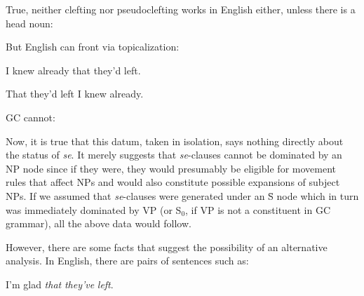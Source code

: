 \z

\z

\z

\z

\z

\z

\noindent True, neither clefting nor pseudoclefting works in English either, unless there is a head noun:

\z

\z
But English can front via topicalization:

\ea\label{ex:2:177}
I knew already that they'd left.
\z

\ea\label{ex:2:178}
That they'd left I knew already.
\z

\noindent GC cannot:

\z

\z

Now, it is true that this datum, taken in isolation, says nothing directly about the status of \textit{se}. It merely suggests that \textit{se}-clauses cannot be dominated by an NP node since if they were, they would presumably be eligible for movement rules that affect NPs and would also constitute possible expansions of subject NPs. If we assumed that \textit{se}-clauses were generated under an \=S node which in turn was immediately dominated by VP (or S$_0$, if VP is not a constituent in GC grammar), all the above data would follow.

However, there are some facts that suggest the possibility of
an alternative analysis. In English, there are pairs of sentences such as:

\ea\label{ex:2:181}
I'm glad \textit{that} \textit{they've} \textit{left}.
\z

